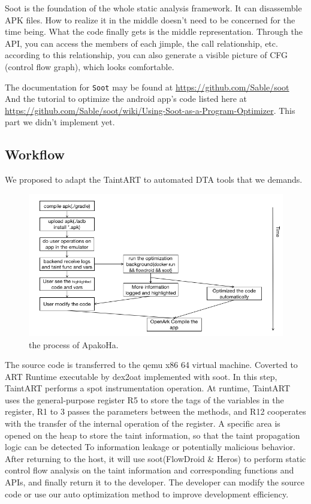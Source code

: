 \documentclass{article}
\begin{document}
Soot is the foundation of the whole static analysis framework. It can disassemble APK files. How to realize it in the middle doesn't need to be concerned for the time being. What the code finally gets is the middle representation. Through the API, you can access the members of each jimple, the call relationship, etc. according to this relationship, you can also generate a visible picture of CFG (control flow graph), which looks comfortable.

The documentation for \verb+Soot+ may be found at  \url{https://github.com/Sable/soot}
And the tutorial to optimize the android app's code listed here at \url{https://github.com/Sable/soot/wiki/Using-Soot-as-a-Program-Optimizer}. This part we didn't implement yet.
\subsection{Workflow}
We proposed to adapt the TaintART to automated DTA tools that we demands. \\

\begin{figure}[ht]
  \centering
  \includegraphics[scale=0.4]{ApakoHa.png}
  \caption{the process of ApakoHa.}
  \label{fig:ApakoHa}
\end{figure}

The source code is transferred to the qemu x86 64 virtual machine. Coverted to ART Runtime executable by dex2oat
                implemented with soot. In this step, TaintART performs a spot instrumentation operation. At runtime, TaintART uses the general-purpose register R5 to store the tags of the variables in the register, R1 to 3 passes the parameters between the methods, and R12 cooperates with the transfer of the internal operation of the register. A specific area is opened on the heap to store the taint information, so that the taint propagation logic can be detected To information leakage or potentially malicious behavior. After returning to the host, it will use soot(FlowDroid \& Heros) to perform static control flow analysis on the taint information and corresponding functions and APIs, and finally return it to the developer. The developer can modify the source code or use our auto optimization method to improve development efficiency. \\
\end{document}
